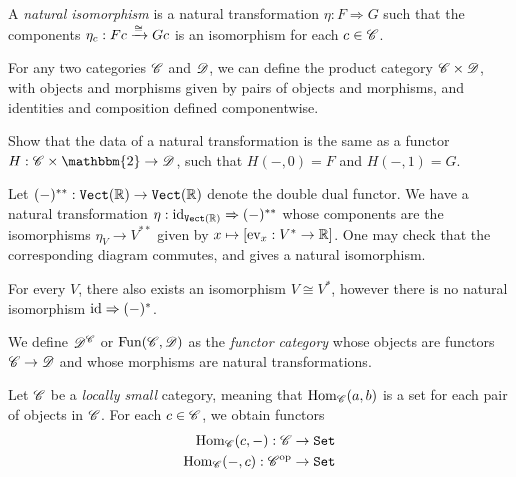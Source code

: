 \documentclass{article}[11pt]
\begin{document}
\begin{definition} A \textit{natural isomorphism} is a natural transformation $\eta: F \Rightarrow G$ such that the components $\eta_c : Fc \xrightarrow{\cong} Gc$ is an isomorphism for each $c\in \mathscr{C}$.
\end{definition}


For any two categories $\mathscr{C}$ and $\mathscr{D}$, we can define the product category $\mathscr{C}\times \mathscr{D}$, with objects and morphisms given by pairs of objects and morphisms, and identities and composition defined componentwise. 

\begin{exercise}\label{} Show that the data of a natural transformation is the same as a functor $H : \C\times\mathbbm{2} \to \D$, such that $H(-,0)=F$ and $H(-,1) = G$. 
\end{exercise}


\begin{example} Let $(-)^{\ast\ast} : \texttt{Vect}(\mathbb{R}) \to \texttt{Vect}(\mathbb{R})$ denote the double dual functor. We have a natural transformation $\eta : \text{id}_{\texttt{Vect}(\mathbb{R})} \Rightarrow (-)^{\ast\ast}$ whose components are the isomorphisms $\eta_V \to V^{\ast\ast}$ given by $x\mapsto [\text{ev}_x : V^\ast \to \mathbb{R}]$. One may check that the corresponding diagram commutes, and gives a natural isomorphism.
\end{example}

\begin{remark} For every $V$, there also exists an isomorphism $V\cong V^\ast$, however there is no natural isomorphism $\text{id} \Rightarrow (-)^\ast$.
\end{remark}

\begin{definition} We define $\mathscr{D}^{\mathscr{C}}$ or $\text{Fun}(\mathscr{C},\mathscr{D})$ as the \textit{functor category} whose objects are functors $\mathscr{C}\to \mathscr{D}$ and whose morphisms are natural transformations.
\end{definition}

Let $\mathscr{C}$ be a \textit{locally small} category, meaning that $\textup{Hom}_{\mathscr{C}}(a,b)$ is a set for each pair of objects in $\mathscr{C}$. For each $c\in \mathscr{C}$, we obtain functors
\begin{align*}
	\textup{Hom}_{\mathscr{C}} (c,-) : \mathscr{C} &\to \texttt{Set} \\
	\textup{Hom}_{\mathscr{C}}(-,c) : \mathscr{C}^{\text{op}} &\to \texttt{Set}
\end{align*}
\end{document}
